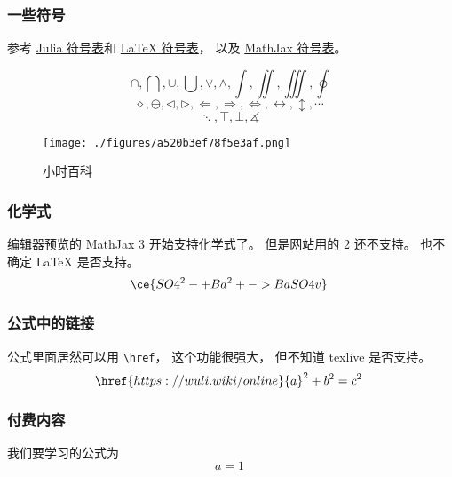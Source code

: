 
\subsubsection{一些符号}
参考 \href{https://docs.julialang.org/en/v1/manual/unicode-input/}{Julia 符号表}和 \href{https://oeis.org/wiki/List_of_LaTeX_mathematical_symbols}{LaTeX 符号表}， 以及 \href{http://www.onemathematicalcat.org/MathJaxDocumentation/TeXSyntax.htm}{MathJax 符号表}。

\begin{equation}
\cap, \bigcap, \cup, \bigcup, \vee, \wedge, \int, \iint, \iiint, \oint
\end{equation}
\begin{equation}
\diamond, \ominus, \triangleleft, \triangleright, \Longleftarrow, \Longrightarrow, \iff, \leftrightarrow, \updownarrow, \cdots~
\end{equation}
\begin{equation}
\ddots, \top, \bot, \measuredangle~
\end{equation}

\begin{figure}[ht]
\centering
\texttt{[image: ./figures/a520b3ef78f5e3af.png]}
\caption{小时百科} \label{fig_test_1}
\end{figure}

\subsubsection{化学式}
编辑器预览的 MathJax 3 开始支持化学式了。 但是网站用的 2 还不支持。 也不确定 LaTeX 是否支持。
\begin{equation}
\ce{SO4^2- + Ba^2+ -> BaSO4 v}~
\end{equation}

\subsubsection{公式中的链接}
公式里面居然可以用 \verb|\href|， 这个功能很强大， 但不知道 texlive 是否支持。
\begin{equation}
\href{https://wuli.wiki/online}{a}^2 + b^2 = c^2~
\end{equation}

\subsubsection{付费内容}
我们要学习的公式为
\begin{equation}\label{eq_test_1}
a = 1~
\end{equation}

